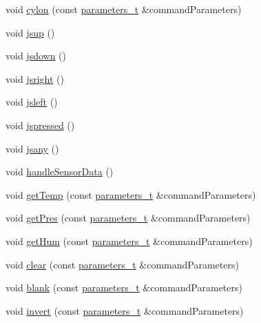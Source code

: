 \begin{DoxyCompactItemize}
\item 
void \hyperlink{class_m_q_t_tsense_h_a_t_ad70cc61332aefd376e2fafd026e51144}{cylon} (const \hyperlink{_heater_m_q_t_t_8h_ad3b3bd6544a775cf1e31cd71610c5765}{parameters\+\_\+t} \&command\+Parameters)
\item 
void \hyperlink{class_m_q_t_tsense_h_a_t_a5d0f57ce2e94813cfa2279d17e4905ae}{jsup} ()
\item 
void \hyperlink{class_m_q_t_tsense_h_a_t_a49af5e2cafdc045b070601e2046ae32c}{jsdown} ()
\item 
void \hyperlink{class_m_q_t_tsense_h_a_t_a94f4010486bd20e7f1ffd602ab4a6df8}{jsright} ()
\item 
void \hyperlink{class_m_q_t_tsense_h_a_t_ab02c2741dda318559e3f22b85ecd9b28}{jsleft} ()
\item 
void \hyperlink{class_m_q_t_tsense_h_a_t_a4a4c34f1818a47a9e111050cdaf94157}{jspressed} ()
\item 
void \hyperlink{class_m_q_t_tsense_h_a_t_ae4e0f972b1ed819bad5954501b8e2597}{jsany} ()
\item 
void \hyperlink{class_m_q_t_tsense_h_a_t_a86bd30bf5003330703c0eca3d29df629}{handle\+Sensor\+Data} ()
\item 
void \hyperlink{class_m_q_t_tsense_h_a_t_a39ff54904e181f55b4242c800e60a95f}{get\+Temp} (const \hyperlink{_heater_m_q_t_t_8h_ad3b3bd6544a775cf1e31cd71610c5765}{parameters\+\_\+t} \&command\+Parameters)
\item 
void \hyperlink{class_m_q_t_tsense_h_a_t_a30a58adadcb37aeccd992ca9458e17e1}{get\+Pres} (const \hyperlink{_heater_m_q_t_t_8h_ad3b3bd6544a775cf1e31cd71610c5765}{parameters\+\_\+t} \&command\+Parameters)
\item 
void \hyperlink{class_m_q_t_tsense_h_a_t_ad61c2741b9e195b607bb8fe6ac9a3832}{get\+Hum} (const \hyperlink{_heater_m_q_t_t_8h_ad3b3bd6544a775cf1e31cd71610c5765}{parameters\+\_\+t} \&command\+Parameters)
\item 
void \hyperlink{class_m_q_t_tsense_h_a_t_af05cb64126bd0591d5ca4bac5b48b111}{clear} (const \hyperlink{_heater_m_q_t_t_8h_ad3b3bd6544a775cf1e31cd71610c5765}{parameters\+\_\+t} \&command\+Parameters)
\item 
void \hyperlink{class_m_q_t_tsense_h_a_t_a7736e041ad475ec82756223c90da547e}{blank} (const \hyperlink{_heater_m_q_t_t_8h_ad3b3bd6544a775cf1e31cd71610c5765}{parameters\+\_\+t} \&command\+Parameters)
\item 
void \hyperlink{class_m_q_t_tsense_h_a_t_aac0a786db57adb1f70f4932bc3800cff}{invert} (const \hyperlink{_heater_m_q_t_t_8h_ad3b3bd6544a775cf1e31cd71610c5765}{parameters\+\_\+t} \&command\+Parameters)

\end{DoxyCompactItemize}
